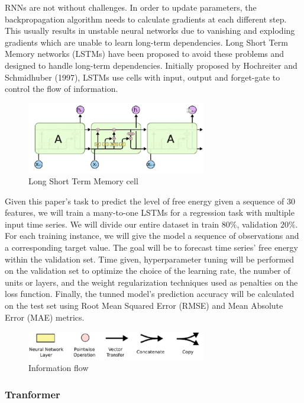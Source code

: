 \documentclass{article}
\begin{document}
RNNs are not without challenges. In order to update parameters, the backpropagation algorithm needs to calculate gradients at each different step. This usually results in unstable neural networks due to vanishing and exploding gradients which are unable to learn long-term dependencies. Long Short Term Memory networks (LSTMs) have been proposed to avoid these problems and designed to handle long-term dependencies. Initially proposed by Hochreiter and Schmidhuber (1997),  LSTMs use cells with input, output and forget-gate to control the flow of information. 
\begin{figure}
    \caption{Long Short Term Memory cell}
    \includegraphics[width=0.7\textwidth]{images/2023-03-17-16-38-22.png}
\end{figure}



Given this paper's task to predict the level of free energy given a sequence of 30 features, we will train a many-to-one LSTMs for a regression task with multiple input time series. We will divide our entire dataset in train $80\%$, validation $20\%$. For each training instance, we will give the model a sequence of observations and a corresponding target value. The goal will be to forecast time series' free energy within the validation set. Time given, hyperparameter tuning will be performed on the validation set to optimize the choice of the learning rate, the number of units or layers, and the weight regularization techniques used as penalties on the loss function. Finally, the tunned model's prediction accuracy will be calculated on the test set using Root Mean Squared Error (RMSE) and Mean Absolute Error (MAE) metrics. 
\begin{figure}
    \caption{Information flow}
    \includegraphics[width=0.7\textwidth]{images/2023-03-17-16-41-25.png}
\end{figure}

\subsubsection{Tranformer}
\end{document}
